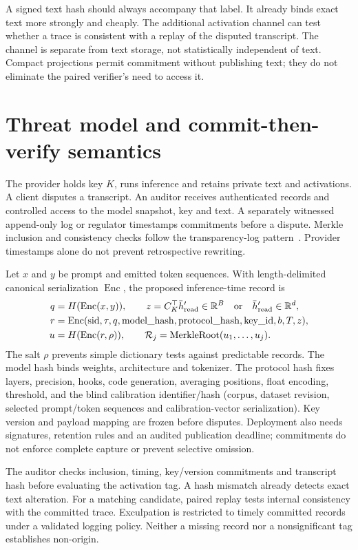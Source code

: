 \documentclass[11pt]{article}
\newcommand{\RR}{\mathbb{R}}
\newcommand{\Enc}{\operatorname{Enc}}
\begin{document}
A signed text hash should always accompany that label. It already binds exact
text more strongly and cheaply. The additional activation channel can test whether
a trace is consistent with a replay of the disputed transcript. The channel is
separate from text storage, not statistically independent of text. Compact
projections permit commitment without publishing text; they do not eliminate the
paired verifier's need to access it.

\section{Threat model and commit-then-verify semantics}
The provider holds key $K$, runs inference and retains private text and activations.
A client disputes a transcript. An auditor receives authenticated records and
controlled access to the model snapshot, key and text. A separately witnessed
append-only log or regulator timestamps commitments before a dispute. Merkle
inclusion and consistency checks follow the transparency-log pattern~\citep{rfc6962}.
Provider timestamps alone do not prevent retrospective rewriting.

Let $x$ and $y$ be prompt and emitted token sequences. With length-delimited
canonical serialization $\Enc$, the proposed inference-time record is
\begin{align}
 q&=H(\Enc(x,y)),\qquad
 z=C_K^\top\bar h'_{\rm read}\in\RR^B
       \quad\text{or}\quad\bar h'_{\rm read}\in\RR^d,\\
 r&=\Enc(\mathrm{sid},\tau,q,\mathrm{model\_hash},\mathrm{protocol\_hash},
               \mathrm{key\_id},b,T,z),\label{eq:record}\\
 u&=H(\Enc(r,\rho)),\qquad
 \mathcal R_j=\operatorname{MerkleRoot}(u_1,\ldots,u_j).
\end{align}
The salt $\rho$ prevents simple dictionary tests against predictable records. The
model hash binds weights, architecture and tokenizer. The protocol hash fixes
layers, precision, hooks, code generation, averaging positions, float encoding,
threshold, and the blind calibration identifier/hash (corpus, dataset revision,
selected prompt/token sequences and calibration-vector serialization). Key version and payload mapping are frozen before disputes. Deployment
also needs signatures, retention rules and an audited publication deadline;
commitments do not enforce complete capture or prevent selective omission.

The auditor checks inclusion, timing, key/version commitments and transcript hash
before evaluating the activation tag. A hash mismatch already detects exact text
alteration. For a matching candidate, paired replay tests internal consistency
with the committed trace. Exculpation is restricted to timely committed records
under a validated logging policy. Neither a missing record nor a nonsignificant
tag establishes non-origin.
\end{document}
